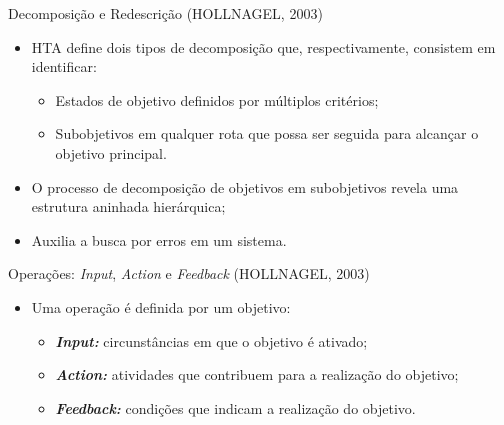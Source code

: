 \documentclass[xcolor=dvipsnames]{beamer}
\let\olditem=\item%
\renewcommand{\item}{\olditem \justifying}%
\begin{document}
\begin{frame}{Decomposição e Redescrição  (HOLLNAGEL, 2003)}

	\begin{itemize}
    
    	
    	\item HTA define dois tipos de decomposição que, respectivamente, consistem em identificar:
        
        
		\begin{itemize}
        
			\item Estados de objetivo definidos por múltiplos critérios;
            
            \bigskip
            
			\item Subobjetivos em qualquer rota que possa ser seguida para alcançar o objetivo principal.
		\end{itemize}
        
        \bigskip
        
		\item O processo de decomposição de objetivos em subobjetivos revela uma estrutura aninhada hierárquica;
        
        \bigskip
        
		\item Auxilia a busca por erros em um sistema.
        
    \end{itemize}
    
\end{frame}


\begin{frame}{Operações: \textit{Input}, \textit{Action} e \textit{Feedback}  (HOLLNAGEL, 2003)}

	\begin{itemize}
    
		\item Uma operação é definida por um objetivo:
        
        \bigskip
        
		\begin{itemize}
        
			\item \textbf{\textit{Input:}} circunstâncias em que o objetivo é ativado;
            
            \bigskip
            
			\item \textbf{\textit{Action:}} atividades que contribuem para a realização do objetivo;
            
            \bigskip
            
			\item \textbf{\textit{Feedback:}} condições que indicam a realização do objetivo.
            
		\end{itemize}
        
        
	\end{itemize}
    
\end{frame}
\end{document}
